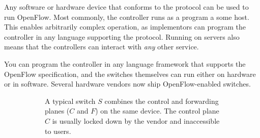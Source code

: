 Any software or hardware device that conforms to the protocol can be used to
run OpenFlow.  Most commonly, the controller runs as a program a some host.
%
This enables arbitrarily complex operation, as implementors can program the
controller in any language supporting the protocol.
%
Running on servers also means that the controllers can interact with 
\textit{any} other service.

You can program the controller in any language framework that supports the
OpenFlow specification, and the switches themselves can run either on
hardware or in software.  Several hardware vendors now ship
OpenFlow-enabled switches.

\begin{figure}
  \centering
  \begin{subfigure}[t]{0.45\textwidth}
    \centering
    \caption{A typical switch $S$ combines the control and
      forwarding planes ($C$ and $F$) on the same device.
        The control plane
        $C$ is usually locked down by the vendor and inaccessible to users.}
    \label{figure:coupling.planes}
  \end{subfigure}%
  \hspace*{0.1\textwidth}%
  \begin{subfigure}[t]{0.45\textwidth}
    \centering
\end{subfigure}
\end{figure}
